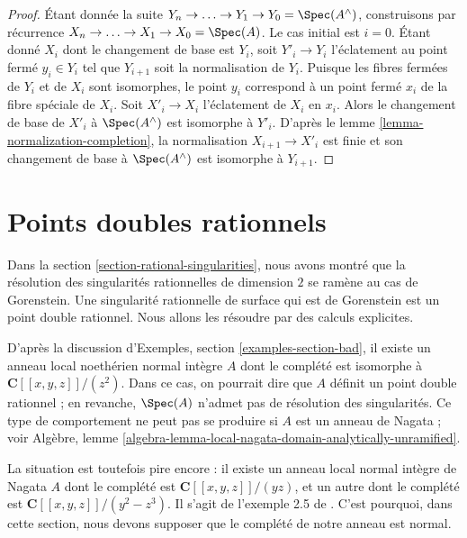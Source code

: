 \begin{proof} Étant donnée la suite $Y_n \to \ldots \to Y_1 \to Y_0 = \Spec(A^\wedge)$, construisons par récurrence $X_n \to \ldots \to X_1 \to X_0 = \Spec(A)$. Le cas initial est $i = 0$. Étant donné $X_i$ dont le changement de base est $Y_i$, soit $Y'_i \to Y_i$ l'éclatement au point fermé $y_i \in Y_i$ tel que $Y_{i + 1}$ soit la normalisation de $Y_i$. Puisque les fibres fermées de $Y_i$ et de $X_i$ sont isomorphes, le point $y_i$ correspond à un point fermé $x_i$ de la fibre spéciale de $X_i$. Soit $X'_i \to X_i$ l'éclatement de $X_i$ en $x_i$. Alors le changement de base de $X'_i$ à $\Spec(A^\wedge)$ est isomorphe à $Y'_i$. D'après le lemme \ref{lemma-normalization-completion}, la normalisation $X_{i + 1} \to X'_i$ est finie et son changement de base à $\Spec(A^\wedge)$ est isomorphe à $Y_{i + 1}$. \end{proof}














\section{Points doubles rationnels} \label{section-rational-double-points}

\noindent Dans la section \ref{section-rational-singularities}, nous avons montré que la résolution des singularités rationnelles de dimension $2$ se ramène au cas de Gorenstein. Une singularité rationnelle de surface qui est de Gorenstein est un point double rationnel. Nous allons les résoudre par des calculs explicites.

\medskip\noindent D'après la discussion d'Exemples, section \ref{examples-section-bad}, il existe un anneau local noethérien normal intègre $A$ dont le complété est isomorphe à $\mathbf{C}[[x, y, z]]/(z^2)$. Dans ce cas, on pourrait dire que $A$ définit un point double rationnel ; en revanche, $\Spec(A)$ n'admet pas de résolution des singularités. Ce type de comportement ne peut pas se produire si $A$ est un anneau de Nagata ; voir Algèbre, lemme \ref{algebra-lemma-local-nagata-domain-analytically-unramified}.

\medskip\noindent La situation est toutefois pire encore : il existe un anneau local normal intègre de Nagata $A$ dont le complété est $\mathbf{C}[[x, y, z]]/(yz)$, et un autre dont le complété est $\mathbf{C}[[x, y, z]]/(y^2 - z^3)$. Il s'agit de l'exemple 2.5 de \cite{Nishimura-few}. C'est pourquoi, dans cette section, nous devons supposer que le complété de notre anneau est normal.

